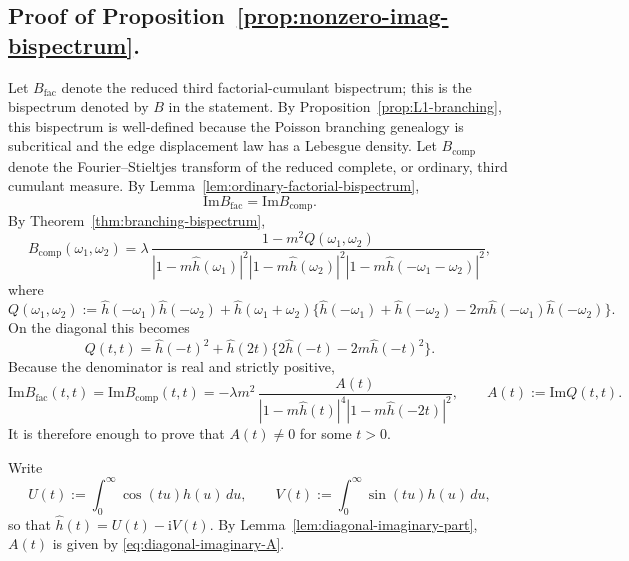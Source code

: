 \documentclass[aap,press]{apt} \volno{00} \partno{00}
\renewcommand{\ii}{\mathrm{i}}
\newcommand{\1}{\mathbf{1}}
\newcommand{\Imm}{\mathrm{Im}}
\numberwithin{equation}{section}
\begin{document}
\subsection{Proof of Proposition~\ref{prop:nonzero-imag-bispectrum}.}
Let $B_{\mathrm{fac}}$ denote the reduced third factorial-cumulant bispectrum; this is the bispectrum denoted by $B$ in the statement. By Proposition~\ref{prop:L1-branching}, this bispectrum is well-defined because the Poisson branching genealogy is subcritical and the edge displacement law has a Lebesgue density. Let $B_{\mathrm{comp}}$ denote the Fourier--Stieltjes transform of the reduced complete, or ordinary, third cumulant measure. By Lemma~\ref{lem:ordinary-factorial-bispectrum},
\[
\Imm B_{\mathrm{fac}}=\Imm B_{\mathrm{comp}}.
\]
By Theorem~\ref{thm:branching-bispectrum},
\[
B_{\mathrm{comp}}(\omega_1,\omega_2)
=\lambda\,
\frac{1-m^2 Q(\omega_1,\omega_2)}
{|1-m\widehat h(\omega_1)|^2 |1-m\widehat h(\omega_2)|^2 |1-m\widehat h(-\omega_1-\omega_2)|^2},
\]
where
\[
Q(\omega_1,\omega_2)
:=\widehat h(-\omega_1)\widehat h(-\omega_2)
+\widehat h(\omega_1+\omega_2)
\{\widehat h(-\omega_1)+\widehat h(-\omega_2)-2m\widehat h(-\omega_1)\widehat h(-\omega_2)\}.
\]
On the diagonal this becomes
\[
Q(t,t)=\widehat h(-t)^2+\widehat h(2t)\{2\widehat h(-t)-2m\widehat h(-t)^2\}.
\]
Because the denominator is real and strictly positive,
\[
\Imm B_{\mathrm{fac}}(t,t)=\Imm B_{\mathrm{comp}}(t,t)
= -\lambda m^2\,
\frac{A(t)}{|1-m\widehat h(t)|^4 |1-m\widehat h(-2t)|^2},
\qquad
A(t):=\Imm Q(t,t).
\]
It is therefore enough to prove that $A(t)\neq0$ for some $t>0$.

Write
\[
U(t):=\int_0^\infty \cos(tu)h(u)\,du,
\qquad
V(t):=\int_0^\infty \sin(tu)h(u)\,du,
\]
so that $\widehat h(t)=U(t)-\ii V(t)$. By Lemma~\ref{lem:diagonal-imaginary-part}, $A(t)$ is given by \eqref{eq:diagonal-imaginary-A}.
\end{document}
